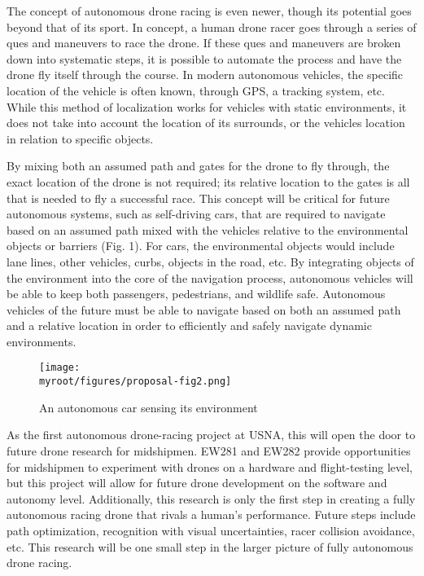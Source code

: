 \documentclass[onecolumn,10pt]{IEEEtran}
\newcommand{\myroot}{../}
\begin{document}
The concept of autonomous drone racing is even newer, though its potential goes beyond that of its sport. In concept, a human drone racer goes through a series of ques and maneuvers to race the drone. If these ques and maneuvers are broken down into systematic steps, it is possible to automate the process and have the drone fly itself through the course. In modern autonomous vehicles, the specific location of the vehicle is often known, through GPS, a tracking system, etc. While this method of localization works for vehicles with static environments, it does not take into account the location of its surrounds, or the vehicles location in relation to specific objects. 

By mixing both an assumed path and gates for the drone to fly through, the exact location of the drone is not required; its relative location to the gates is all that is needed to fly a successful race. This concept will be critical for future autonomous systems, such as self-driving cars, that are required to navigate based on an assumed path mixed with the vehicles relative to the environmental objects or barriers (Fig. 1). For cars, the environmental objects would include lane lines, other vehicles, curbs, objects in the road, etc. By integrating objects of the environment into the core of the navigation process, autonomous vehicles will be able to keep both passengers, pedestrians, and wildlife safe. Autonomous vehicles of the future must be able to navigate based on both an assumed path and a relative location in order to efficiently and safely navigate dynamic environments.  
\begin{figure}
\begin{center}
\texttt{[image: \\myroot/figures/proposal-fig2.png]}
\end{center}
\caption{An autonomous car sensing its environment}
\label{fig2}
\end{figure}

As the first autonomous drone-racing project at USNA, this will open the door to future drone research for midshipmen. EW281 and EW282 provide opportunities for midshipmen to experiment with drones on a hardware and flight-testing level, but this project will allow for future drone development on the software and autonomy level. Additionally, this research is only the first step in creating a fully autonomous racing drone that rivals a human’s performance. Future steps include path optimization, recognition with visual uncertainties, racer collision avoidance, etc. This research will be one small step in the larger picture of fully autonomous drone racing.
\end{document}
